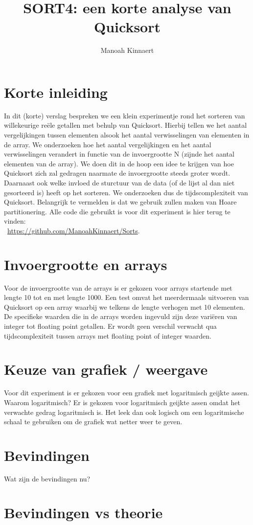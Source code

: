 \documentclass[12pt, dutch]{article}
\title{SORT4: een korte analyse van Quicksort}
\author{Manoah Kinnaert}
\begin{document}
\begin{titlepage}
    \maketitle
\end{titlepage}
\pagebreak
\section{Korte inleiding}
In dit (korte) verslag bespreken we een klein experimentje rond het sorteren van willekeurige reële getallen met behulp van Quicksort. Hierbij tellen we het aantal vergelijkingen tussen elementen alsook het aantal verwisselingen
van elementen in de array. We onderzoeken hoe het aantal vergelijkingen en het aantal verwisselingen verandert in functie van de invoergrootte N (zijnde het aantal elementen van de array).
We doen dit in de hoop een idee te krijgen van hoe Quicksort zich zal gedragen naarmate de invoergrootte steeds groter wordt. Daarnaast ook welke invloed de sturctuur van de data (of de lijst al dan niet gesorteerd is) heeft op het sorteren.
We onderzoeken dus de tijdscomplexiteit van Quicksort. Belangrijk te vermelden is dat we gebruik zullen maken van Hoare partitionering.
Alle code die gebruikt is voor dit experiment is hier terug te vinden: \\\ 
\url{https://github.com/ManoahKinnaert/Sorts}.

\section{Invoergrootte en arrays}
Voor de invoergrootte van de arrays is er gekozen voor arrays startende met lengte 10 tot en met lengte 1000. 
Een test omvat het meerdermaals uitvoeren van Quicksort op een array waarbij we telkens de lengte verhogen met 10 elementen.
De specifieke waarden die in de arrays worden ingevuld zijn deze variëren van integer tot floating point getallen. Er wordt geen verschil verwacht qua tijdscomplexiteit
tussen arrays met floating point of integer waarden.

\section{Keuze van grafiek / weergave}
Voor dit experiment is er gekozen voor een grafiek met logaritmisch geijkte assen. Waarom logaritmisch?
Er is gekozen voor logaritmisch geijkte assen omdat het verwachte gedrag logaritmisch is. Het leek dan ook logisch om een logaritmische schaal te gebruiken om de grafiek wat netter weer te geven.

\section{Bevindingen}
Wat zijn de bevindingen nu?

\section{Bevindingen vs theorie}
\end{document}
